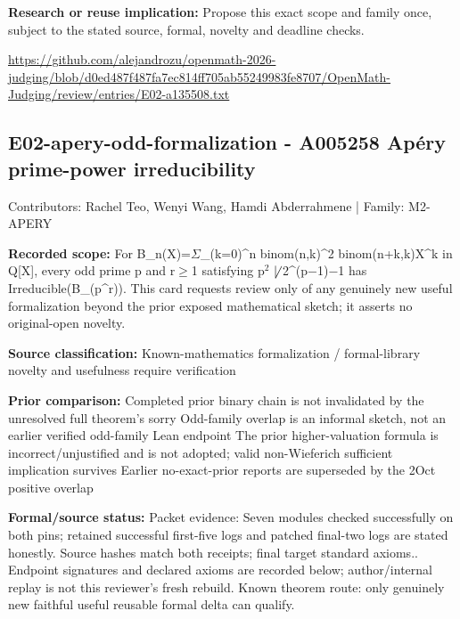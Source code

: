 \documentclass[11pt,a4paper]{article}
\begin{document}
\textbf{Research or reuse implication:} Propose this exact scope and family once, subject to the stated source, formal, novelty and deadline checks.

{\small \url{https://github.com/alejandrozu/openmath-2026-judging/blob/d0ed487f487fa7ec814ff705ab55249983fe8707/OpenMath-Judging/review/entries/E02-a135508.txt}\par}

\begin{samepage}
\subsection{E02-apery-odd-formalization  -  A005258 Apéry prime-power irreducibility}
{\small Contributors: Rachel Teo, Wenyi Wang, Hamdi Abderrahmene | Family: M2-APERY\par}

\textbf{Recorded scope:} For B\_n(X)=\ensuremath{\Sigma}\_(k=0)\textasciicircum{}n binom(n,k)\textasciicircum{}2 binom(n+k,k)X\textasciicircum{}k in Q[X], every odd prime p and r\ensuremath{\geq}1 satisfying p\ensuremath{^2} \ensuremath{\not\mid} 2\textasciicircum{}(p\ensuremath{-}1)\ensuremath{-}1 has Irreducible(B\_(p\textasciicircum{}r)). This card requests review only of any genuinely new useful formalization beyond the prior exposed mathematical sketch; it asserts no original-open novelty.

\end{samepage}
\textbf{Source classification:} Known-mathematics formalization / formal-library novelty and usefulness require verification

\textbf{Prior comparison:} Completed prior binary chain is not invalidated by the unresolved full theorem's sorry Odd-family overlap is an informal sketch, not an earlier verified odd-family Lean endpoint The prior higher-valuation formula is incorrect/unjustified and is not adopted; valid non-Wieferich sufficient implication survives Earlier no-exact-prior reports are superseded by the 2Oct positive overlap

\textbf{Formal/source status:} Packet evidence: Seven modules checked successfully on both pins; retained successful first-five logs and patched final-two logs are stated honestly. Source hashes match both receipts; final target standard axioms.. Endpoint signatures and declared axioms are recorded below; author/internal replay is not this reviewer's fresh rebuild. Known theorem route: only genuinely new faithful useful reusable formal delta can qualify.
\end{document}
